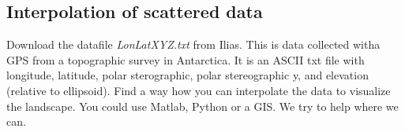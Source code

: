 \subsection{Interpolation of scattered data}
\label{Sec:Interpolation}
Download the datafile \textit{LonLatXYZ.txt} from Ilias. This is data collected witha GPS from a topographic survey in Antarctica. It is an ASCII txt file with longitude, latitude, polar sterographic, polar stereographic y, and elevation (relative to ellipsoid). Find a way how you can interpolate the data to visualize the landscape. You could use Matlab, Python or a GIS. We try to help where we can. 

\ifanswers
\begin{tcolorbox}[enhanced jigsaw,breakable,pad at break*=1mm,
    colback=blue!5!white,colframe=babyblueeyes,title=Solutions]
    
\end{tcolorbox}
\fi
